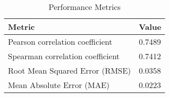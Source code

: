 \documentclass{article}
\begin{document}
\begin{table}[h!]
\centering
\begin{tabular}{ll}
\toprule
Metric & Value \\
\midrule
Pearson correlation coefficient & 0.7489 \\
Spearman correlation coefficient & 0.7412 \\
Root Mean Squared Error (RMSE) & 0.0358 \\
Mean Absolute Error (MAE) & 0.0223 \\
\bottomrule
\end{tabular}
\caption{Performance Metrics}
\label{tab:metrics}
\end{table}
\end{document}
